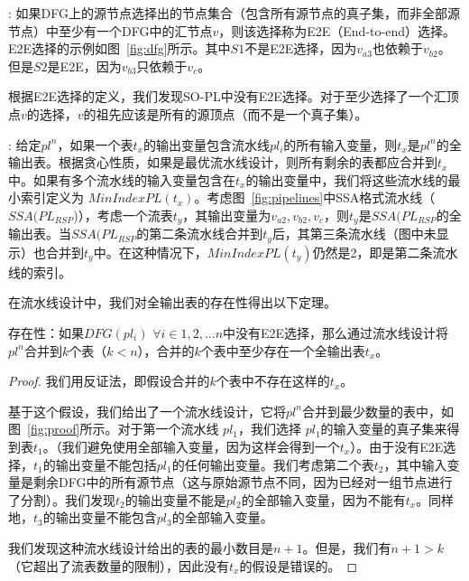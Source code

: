 : 如果DFG上的源节点选择出的节点集合（包含所有源节点的真子集，而非全部源节点）中至少有一个DFG中的汇节点$v$，则该选择称为E2E（End-to-end）选择。E2E选择的示例如图~\ref{fig:dfg}所示。其中$S1$不是E2E选择，因为$v_{a3}$也依赖于$v_{b2}$。但是$S2$是E2E，因为$v_{b3}$只依赖于$v_c$。

根据E2E选择的定义，我们发现SO-PL中没有E2E选择。对于至少选择了一个汇顶点$v$的选择，$v$的祖先应该是所有的源顶点（而不是一个真子集）。

: 给定$pl^n$，如果一个表$t_x$的输出变量包含流水线$pl_i$的所有输入变量，则$t_x$是$pl^n$的全输出表。根据贪心性质，如果是最优流水线设计，则所有剩余的表都应合并到$t_x$中。如果有多个流水线的输入变量包含在$t_x$的输出变量中，我们将这些流水线的最小索引定义为 $MinIndexPL(t_x)$。考虑图~\ref{fig:pipelines}中SSA格式流水线（$SSA(PL_{RSP}$)），考虑一个流表$t_y$，其输出变量为$v_{a2}, v_{b2}, v_c$，则$t_y$是$SSA(PL_{RSP}$的全输出表。当$SSA(PL_{RSP}$的第二条流水线合并到$t_y$后，其第三条流水线（图中未显示）也合并到$t_y$中。在这种情况下，$MinIndexPL(t_y)$仍然是2，即是第二条流水线的索引。


在流水线设计中，我们对全输出表的存在性得出以下定理。

\begin{theorem}
\label{lp-prop1}
存在性：如果$DFG(pl_i)$ $\forall i \in 1, 2, ... n$中没有E2E选择，那么通过流水线设计将$pl^n$合并到$k$个表（$k < n$），合并的$k$个表中至少存在一个全输出表$t_x$。
\end{theorem}

\begin{proof}
我们用反证法，即假设合并的$k$个表中不存在这样的$t_x$。

基于这个假设，我们给出了一个流水线设计，它将$pl^n$合并到最少数量的表中，如图~\ref{fig:proof}所示。对于第一个流水线 $pl_1$，我们选择 $pl_1$的输入变量的真子集来得到表$t_1$。（我们避免使用全部输入变量，因为这样会得到一个$t_x$）。由于没有E2E选择，$t_1$的输出变量不能包括$pl_1$的任何输出变量。我们考虑第二个表$t_2$，其中输入变量是剩余DFG中的所有源节点（这与原始源节点不同，因为已经对一组节点进行了分割）。我们发现$t_2$的输出变量不能是$pl_2$的全部输入变量，因为不能有$t_x$。同样地，$t_3$的输出变量不能包含$pl_3$的全部输入变量。

我们发现这种流水线设计给出的表的最小数目是$n+1$。但是，我们有$n + 1 > k$（它超出了流表数量的限制），因此没有$t_x$的假设是错误的。
\end{proof}


